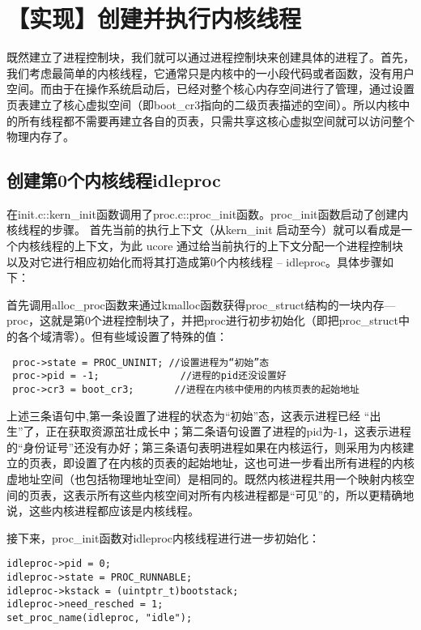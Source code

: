 \section{【实现】创建并执行内核线程}\label{ux5b9eux73b0ux521bux5efaux5e76ux6267ux884cux5185ux6838ux7ebfux7a0b}

既然建立了进程控制块，我们就可以通过进程控制块来创建具体的进程了。首先，我们考虑最简单的内核线程，它通常只是内核中的一小段代码或者函数，没有用户空间。而由于在操作系统启动后，已经对整个核心内存空间进行了管理，通过设置页表建立了核心虚拟空间（即boot\_cr3指向的二级页表描述的空间）。所以内核中的所有线程都不需要再建立各自的页表，只需共享这核心虚拟空间就可以访问整个物理内存了。

\subsection{创建第0个内核线程idleproc}\label{ux521bux5efaux7b2c0ux4e2aux5185ux6838ux7ebfux7a0bidleproc}

在init.c::kern\_init函数调用了proc.c::proc\_init函数。proc\_init函数启动了创建内核线程的步骤。
首先当前的执行上下文（从kern\_init
启动至今）就可以看成是一个内核线程的上下文，为此 ucore
通过给当前执行的上下文分配一个进程控制块以及对它进行相应初始化而将其打造成第0个内核线程
-- idleproc。具体步骤如下：

首先调用alloc\_proc函数来通过kmalloc函数获得proc\_struct结构的一块内存---proc，这就是第0个进程控制块了，并把proc进行初步初始化（即把proc\_struct中的各个域清零）。但有些域设置了特殊的值：

\begin{lstlisting}
 proc->state = PROC_UNINIT; //设置进程为“初始”态
 proc->pid = -1;              //进程的pid还没设置好
 proc->cr3 = boot_cr3;       //进程在内核中使用的内核页表的起始地址
\end{lstlisting}

上述三条语句中,第一条设置了进程的状态为``初始''态，这表示进程已经
``出生''了，正在获取资源茁壮成长中；第二条语句设置了进程的pid为-1，这表示进程的``身份证号''还没有办好；第三条语句表明进程如果在内核运行，则采用为内核建立的页表，即设置了在内核的页表的起始地址，这也可进一步看出所有进程的内核虚地址空间（也包括物理地址空间）是相同的。既然内核进程共用一个映射内核空间的页表，这表示所有这些内核空间对所有内核进程都是``可见''的，所以更精确地说，这些内核进程都应该是内核线程。

接下来，proc\_init函数对idleproc内核线程进行进一步初始化：

\begin{lstlisting}
idleproc->pid = 0;
idleproc->state = PROC_RUNNABLE;
idleproc->kstack = (uintptr_t)bootstack;
idleproc->need_resched = 1;
set_proc_name(idleproc, "idle");
\end{lstlisting}

